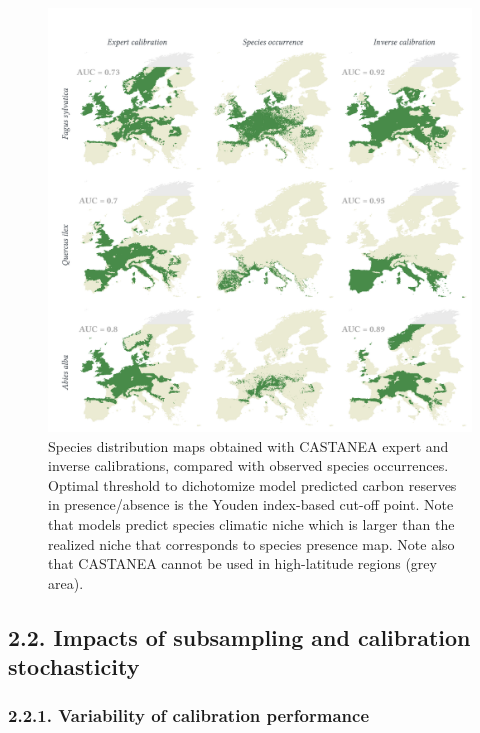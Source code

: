 \documentclass[11pt,]{article}
\begin{document}
\begin{figure}[H]

{\centering \includegraphics{figs/castaneamaps} 

}

\caption{Species distribution maps obtained with CASTANEA expert and inverse calibrations, compared with observed species occurrences. Optimal threshold to dichotomize model predicted carbon reserves in presence/absence is the Youden index-based cut-off point. Note that models predict species climatic niche which is larger than the realized niche that corresponds to species presence map. Note also that CASTANEA cannot be used in high-latitude regions (grey area).}\label{fig:castaneamaps}
\end{figure}

\hypertarget{impacts-of-subsampling-and-calibration-stochasticity}{%
\subsection{2.2. Impacts of subsampling and calibration
stochasticity}\label{impacts-of-subsampling-and-calibration-stochasticity}}

\hypertarget{variability-of-calibration-performance}{%
\subsubsection{2.2.1. Variability of calibration
performance}\label{variability-of-calibration-performance}}
\end{document}
